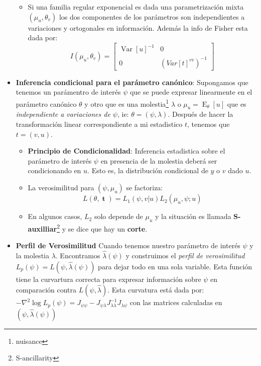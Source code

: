 \documentclass[pdftex,11pt,a4paper]{article}
\DeclareMathOperator{\est}{\mathbf{t}}
\DeclareMathOperator{\E}{E}
\DeclareMathOperator{\Var}{Var}
\begin{document}
\begin{itemize}
\begin{itemize}
		\item Si una familia regular exponencial es dada una parametrización mixta $(\mu_u,\theta_v)$ los dos componentes de los parámetros son independientes a variaciones y ortogonales en información. Además la info de Fisher esta dada por: $$I(\mu_u,\theta_v) = \begin{bmatrix}
		\Var[u]^{-1} & 0 \\
		0 & (Var[t]^{vv})^{-1}
		\end{bmatrix}$$
	\end{itemize}
		\item \textbf{Inferencia condicional para el parámetro canónico}: Supongamos que tenemos un parámentro de interés $\psi$ que se puede expresar linearmente en el parámetro canónico $\theta$ y otro que es una molestia\footnote{nuisance} $\lambda$ o $\mu_u = \E_\theta[u]$ que es \emph{independiente a variaciones de $\psi$}, ie: $\theta = (\psi,\lambda)$. Después de hacer la transformación linear correspondiente a mi estadistico $t$, tenemos que $t = (v,u)$.
	\begin{itemize}
		\item \textbf{Principio de Condicionalidad}: Inferencia estadistica sobre el parámetro de interés $\psi$ en presencia de la molestia deberá ser condicionando en $u$. Esto es, la distribución condicional de $y$ o $v$ dado $u$. 
		\item La verosimilitud para $(\psi, \mu_u)$ se factoriza: $$L(\theta,\est) = L_1(\psi,v|u)L_2(\mu_u,\psi;u)$$ 
		\item En algunos casos, $L_2$ solo depende de $\mu_u$ y la situación es llamada \textbf{S-auxilliar}\footnote{S-ancillarity} y se dice que hay un \textbf{corte}.
	\end{itemize}
	\item \textbf{Perfil de Verosimilitud} Cuando tenemos nuestro parámetro de interés $\psi$ y la molestia $\lambda$. Encontramos $\hat{\lambda}(\psi)$ y construimos el \emph{perfil de verosimilitud} $L_p(\psi) = L(\psi,\hat{\lambda}(\psi))$ para dejar todo en una sola variable. Esta función tiene la curvartura correcta para expresar información sobre $\psi$ en comparación contra $L(\psi,\hat{\lambda})$. Esta curvatura está dada por: $-\nabla^2 \log L_p(\psi) = J_{\psi\psi}- J_{\psi\lambda}J_{\lambda\lambda}^{-1}J_{\lambda\psi}$ con las matrices calculadas en $(\psi,\hat{\lambda}(\psi))$
\end{itemize}
\end{document}
